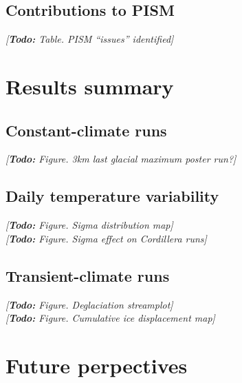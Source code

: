 \documentclass{article}
\newcommand{\todo}[1]{\emph{[\textbf{Todo:} #1]}}
\begin{document}
\subsection{Contributions to PISM}
\todo{Table. PISM ``issues'' identified}

\section{Results summary}

\subsection{Constant-climate runs}
\todo{Figure. 3km last glacial maximum poster run?}

\subsection{Daily temperature variability}
\todo{Figure. Sigma distribution map}\\
\todo{Figure. Sigma effect on Cordillera runs}

\subsection{Transient-climate runs}
\todo{Figure. Deglaciation streamplot}\\
\todo{Figure. Cumulative ice displacement map}

\section{Future perpectives}

\newcommand{\urlprefix}[0]{}  %



\end{document}
